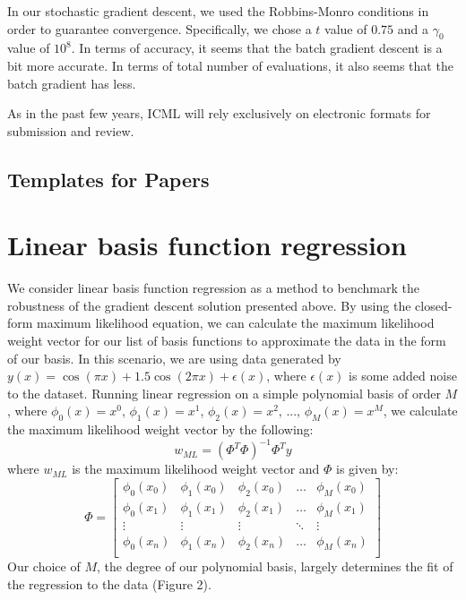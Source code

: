 \documentclass{article}
\begin{document}
In our stochastic gradient descent, we used the Robbins-Monro conditions in order to guarantee convergence. Specifically, we chose a $t$ value of $0.75$ and a $\gamma_{0}$ value of $10^{8}$. In terms of accuracy, it seems that the batch gradient descent is a bit more accurate. In terms of total number of evaluations, it also seems that the batch gradient has less.     
 
\label{submission}

As in the past few years, ICML will rely exclusively on
electronic formats for submission and review.


\subsection{Templates for Papers}


\section{Linear basis function regression}

We consider linear basis function regression as a method to benchmark the robustness of the gradient descent solution presented above. By using the closed-form maximum likelihood equation, we can calculate the maximum likelihood weight vector for our list of basis functions to approximate the data in the form of our basis. In this scenario, we are using data generated by $y(x) = \cos(\pi x) + 1.5 \cos(2 \pi x) + \epsilon(x)$, where $\epsilon(x)$ is some added noise to the dataset. Running linear regression on a simple polynomial basis of order $M$, where $\phi_0(x) = x^0$, $\phi_1(x) = x^1$, $\phi_2(x) = x^2$, ..., $\phi_M(x) = x^M$, we calculate the maximum likelihood weight vector by the following:
$$w_{ML} = (\Phi^T \Phi)^{-1} \Phi^T y$$
where $w_{ML}$ is the maximum likelihood weight vector and $\Phi$ is given by:
$$\Phi =
\begin{bmatrix}
  \phi_0(x_0)   & \phi_1(x_0)   & \phi_2(x_0)   & \dots   & \phi_M(x_0) \\
  \phi_0(x_1)   & \phi_1(x_1)   & \phi_2(x_1)   & \dots   & \phi_M(x_1) \\
  \vdots        & \vdots        & \vdots        & \ddots  & \vdots \\
  \phi_0(x_n)   & \phi_1(x_n)   & \phi_2(x_n)   & \dots   & \phi_M(x_n) \\
\end{bmatrix}
$$
Our choice of $M$, the degree of our polynomial basis, largely determines the fit of the regression to the data (Figure 2). \\
\end{document}
